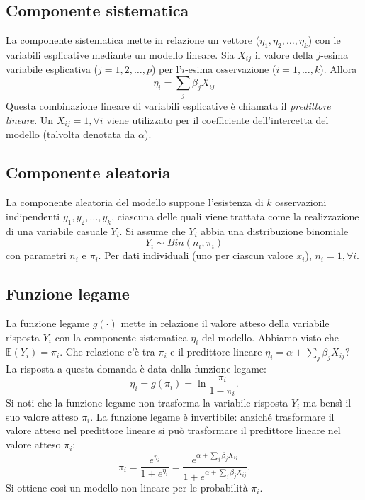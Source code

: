 \subsection{Componente sistematica}

La componente sistematica mette in relazione un vettore ($\eta_1, \eta_2, \dots, \eta_k$) con le variabili esplicative mediante un modello lineare.
 Sia $X_{ij}$ il valore della $j$-esima variabile esplicativa
    ($j=1, 2, \dots, p$) per l'$i$-esima osservazione ($i=1, \dots, k$). Allora 
  \[
  \eta_i = \sum_j \beta_j X_{ij}
  \]
Questa combinazione lineare di variabili esplicative \`e
    chiamata il \emph{predittore lineare}.
 Un $X_{ij}=1, \forall i$ viene utilizzato per il coefficiente
    dell'intercetta del modello (talvolta denotata da $\alpha$).

\subsection{Componente aleatoria}

La  componente aleatoria del modello suppone l'esistenza di
  $k$ osservazioni indipendenti $y_1, y_2, \dots, y_k$, ciascuna delle
  quali viene trattata come la realizzazione di una variabile casuale
  $Y_i$. Si assume che $Y_i$ abbia una distribuzione binomiale
    \[
    Y_i \sim Bin(n_i, \pi_i)
    \]
    con parametri $n_i$ e $\pi_i$.
Per dati individuali (uno per ciascun valore $x_i$), $n_i=1,
    \forall i$.
  
\subsection{Funzione legame}

La  funzione legame $g(\cdot)$  mette in relazione il valore atteso della variabile risposta $Y_i$ con la componente sistematica $\eta_i$ del modello.
Abbiamo visto che $\mathbb{E}(Y_i)=\pi_i$.
Che relazione c'è tra $\pi_i$ e il predittore lineare $\eta_i= \alpha + \sum_j  \beta_j X_{ij}$? 
La risposta a questa domanda è data dalla funzione legame:
  \[
  \eta_i = g(\pi_i) = \ln{\frac{\pi_i}{1-\pi_i}}.
  \]
Si noti che la funzione legame non trasforma la variabile risposta $Y_i$ ma bensì il suo valore atteso $\pi_i$.
La funzione legame è invertibile: anziché trasformare il valore atteso nel predittore lineare si può trasformare il predittore lineare nel valore atteso $\pi_i$:
\[
\pi_i = \frac{e^{\eta_i}}{1+e^{\eta_i}} =  \frac{e^{\alpha + \sum_j  \beta_j X_{ij}}}{1+e^{\alpha + \sum_j  \beta_j X_{ij}}}.
\]
Si ottiene così un modello non lineare per le probabilità $\pi_i$.

